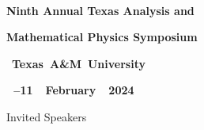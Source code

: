 \documentclass[a3,portrait]{a0poster}
\makeatletter
\providecommand{\LenToUnit}[1]{#1\@gobble}
\newcommand{\PRH}[5]{%
\AddToShipoutPicture*{\put(\LenToUnit{#3},\LenToUnit{#4}){%
     \parbox[b][\paperheight]{\paperwidth}{%
       \vfill
       \centering
       \texttt{[image: \#5]}%
       \vfill
     }}}
}
\makeatother
\begin{document}
\begin{center}


\ \vskip -15mm




\color{white}
{\bfseries\LARGE
Ninth Annual Texas Analysis and
}

\vskip 4mm

{\bfseries\LARGE Mathematical Physics Symposium
}



\vskip 1cm



\mbox{
\textbf{
\Large
\quad
Texas A\&M University
}
}

\vskip 1cm

\mbox{
\textbf{
\large
{}\,--11 \ February \ 2024
}
}


\end{center}



\medskip

\color{PomegranateRed}





\vskip 4cm

\hskip 7cm{\bsifamily\large Invited Speakers}

\vskip 1cm
\end{document}
